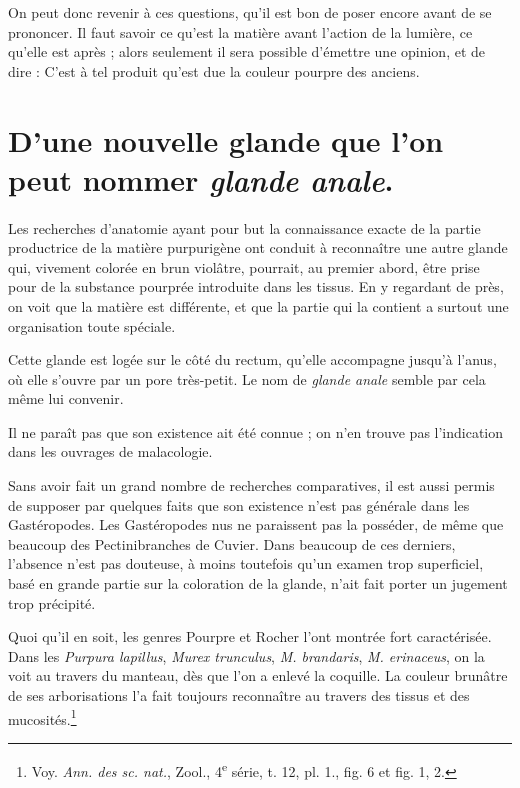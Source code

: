 \documentclass[a4paper, 11pt, oneside, polutonikogreek, french]{article}
\begin{document}
On peut donc revenir à ces questions, qu'il est bon de poser encore avant de se prononcer. Il faut savoir ce qu'est la matière avant l'action de la lumière, ce qu'elle est après ; alors seulement il sera possible d'émettre une opinion, et de dire : C'est à tel produit qu'est due la couleur pourpre des anciens.
\clearpage
\section{D'une nouvelle glande que l'on peut nommer \emph{glande anale}.}
\paragraph{}
Les recherches d'anatomie ayant pour but la connaissance exacte de la partie productrice de la matière purpurigène ont conduit à reconnaître une autre glande qui, vivement colorée en brun violâtre, pourrait, au premier abord, être prise pour de la substance pourprée introduite dans les tissus. En y regardant de près, on voit que la matière est différente, et que la partie qui la contient a surtout une organisation toute spéciale.

Cette glande est logée sur le côté du rectum, qu'elle accompagne jusqu'à l'anus, où elle s'ouvre par un pore très-petit. Le nom de \emph{glande anale} semble par cela même lui convenir.

Il ne paraît pas que son existence ait été connue ; on n'en trouve pas l'indication dans les ouvrages de malacologie.

Sans avoir fait un grand nombre de recherches comparatives, il est aussi permis de supposer par quelques faits que son existence n'est pas générale dans les Gastéropodes. Les Gastéropodes nus ne paraissent pas la posséder, de même que beaucoup des Pectinibranches de Cuvier. Dans beaucoup de ces derniers, l'absence n'est pas douteuse, à moins toutefois qu'un examen trop superficiel, basé en grande partie sur la coloration de la glande, n'ait fait porter un jugement trop précipité.

Quoi qu'il en soit, les genres Pourpre et Rocher l'ont montrée fort caractérisée. Dans les \emph{Purpura lapillus}, \emph{Murex trunculus}, \emph{M. brandaris}, \emph{M. erinaceus}, on la voit au travers du manteau, dès que l'on a enlevé la coquille. La couleur brunâtre de ses arborisations l'a fait toujours reconnaître au travers des tissus et des mucosités.\footnote{Voy. \emph{Ann. des sc. nat.}, Zool., 4\textsuperscript{e} série, t. 12, pl. 1., fig. 6 et fig. 1, 2.}
\end{document}
